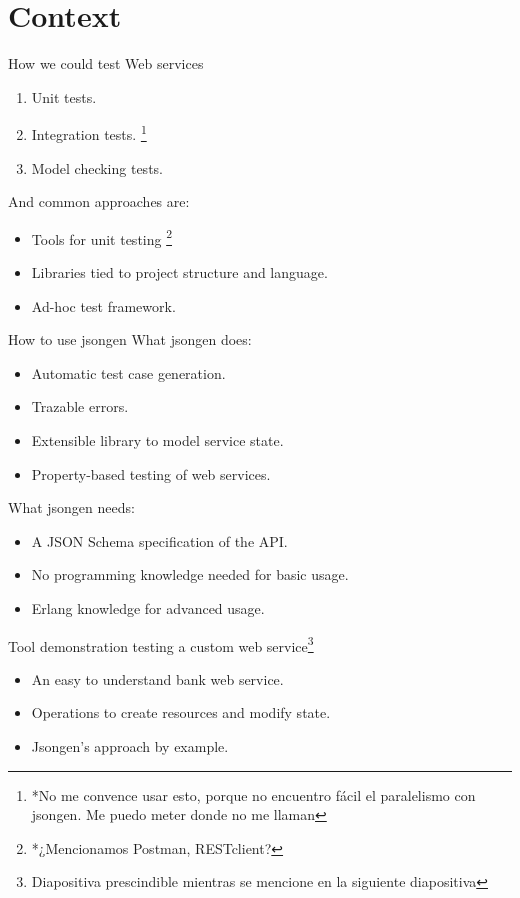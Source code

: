 \section{Context}

\begin{frame}{How we could test Web services}

  \begin{enumerate}
\item Unit tests.
\item Integration tests. \footnote{*No me convence usar esto, porque no encuentro fácil el paralelismo con jsongen. Me puedo meter donde no me llaman}
\item Model checking tests.

  \end{enumerate}

And common approaches are:
\begin{itemize}
\item Tools for unit testing \footnote{*¿Mencionamos Postman, RESTclient?}
\item Libraries tied to project structure and language.
\item Ad-hoc test framework.
\end{itemize}
\end{frame}

\begin{frame}{How to use jsongen}
  What jsongen does:
\begin{itemize}
\item Automatic test case generation.
\item Trazable errors.
\item Extensible library to model service state.
\item Property-based testing of web services.
\end{itemize}

What jsongen needs:
  \begin{itemize}
    \item A JSON Schema specification of the API.
    \item No programming knowledge needed for basic usage.
    \item Erlang knowledge for advanced usage.
  \end{itemize}
\end{frame}

\begin{frame}{Tool demonstration testing a custom web
    service\footnote{Diapositiva prescindible mientras se mencione en la siguiente
    diapositiva}}
  \begin{itemize}
  \item An easy to understand bank web service.
  \item Operations to create resources and modify state.
  \item Jsongen's approach by example.
  \end{itemize}
\end{frame}